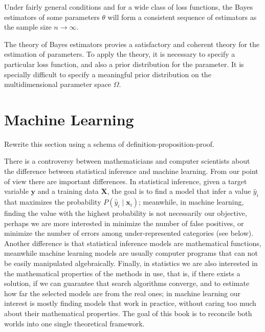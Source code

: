 {Under fairly general conditions and for a wide class of loss functions, the Bayes estimators of some parameters $\theta$ will form a consistent sequence of estimators as the sample size $n \rightarrow \infty$.

The theory of Bayes estimators provies a satisfactory and coherent theory for the estimation of parameters. To apply the theory, it is necessary to specify a particular loss function, and also a prior distribution for the parameter. It is specially difficult to specify a meaningful prior distribution on the multidimensional parameter space $\Omega$.

}






%
%

\section{Machine Learning}
\label{sec:machine_learning}

{\color{red} Rewrite this section using a schema of definition-proposition-proof.}

There is a controversy between mathematicians and computer scientists about the difference between statistical inference and machine learning. From our point of view there are important differences. In statistical inference, given a target variable $\mathbf{y}$ and a training data $\mathbf{X}$, the goal is to find a model that infer a value $\hat{y}_i$ that maximizes the probability $P(\hat{y}_i \mid \mathbf{x}_i)$; meanwhile, in machine learning, finding the value with the highest probability is not necessarily our objective, perhaps we are more interested in minimize the number of false positives, or minimize the number of errors among under-represented categories (see below). Another difference is that statistical inference models are mathematical functions, meanwhile machine learning models are usually computer programs that can not be easily manipulated algebraically. Finally, in statistics we are also interested in the mathematical properties of the methods in use, that is, if there exists a solution, if we can guarantee that search algorithms converge, and to estimate how far the selected models are from the real ones; in machine learning our interest is mostly finding models that work in practice, without caring too much about their mathematical properties. The goal of this book is to reconcile both worlds into one single theoretical framework.

